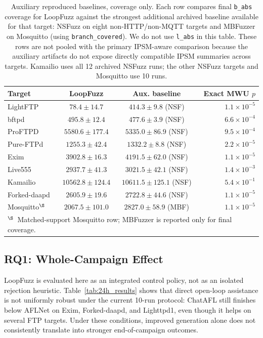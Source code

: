 \documentclass[conference]{IEEEtran}
\begin{document}
\begin{table}[!t]
\centering
\caption{Auxiliary reproduced baselines, coverage only. Each row compares final \texttt{b\_abs} coverage for LoopFuzz against the strongest additional archived baseline available for that target: NSFuzz on eight non-HTTP/non-MQTT targets and MBFuzzer on Mosquitto (using \texttt{branch\_covered}). We do not use \texttt{l\_abs} in this table. These rows are not pooled with the primary IPSM-aware comparison because the auxiliary artifacts do not expose directly compatible IPSM summaries across targets. Kamailio uses all 12 archived NSFuzz runs; the other NSFuzz targets and Mosquitto use 10 runs.}
\label{tab:aux_results}
{\scriptsize
\setlength{\tabcolsep}{3.2pt}
\renewcommand{\arraystretch}{0.96}
\begin{tabular}{l|ccr}
\toprule
Target & LoopFuzz & Aux. baseline & Exact MWU $p$ \\
\midrule
LightFTP & $78.4 {\pm} 14.7$ & $\mathbf{414.3 {\pm} 9.8}$ (NSF) & $1.1{\times}10^{-5}$ \\
bftpd & $\mathbf{495.8 {\pm} 12.4}$ & $477.6 {\pm} 3.9$ (NSF) & $6.6{\times}10^{-4}$ \\
ProFTPD & $\mathbf{5580.6 {\pm} 177.4}$ & $5335.0 {\pm} 86.9$ (NSF) & $9.5{\times}10^{-4}$ \\
Pure-FTPd & $1255.3 {\pm} 42.4$ & $\mathbf{1332.2 {\pm} 8.8}$ (NSF) & $2.2{\times}10^{-5}$ \\
Exim & $3902.8 {\pm} 16.3$ & $\mathbf{4191.5 {\pm} 62.0}$ (NSF) & $1.1{\times}10^{-5}$ \\
Live555 & $2937.7 {\pm} 41.3$ & $\mathbf{3021.5 {\pm} 42.1}$ (NSF) & $1.4{\times}10^{-3}$ \\
Kamailio & $10562.8 {\pm} 124.4$ & $\mathbf{10611.5 {\pm} 125.1}$ (NSF) & $5.4{\times}10^{-1}$ \\
Forked-daapd & $2605.9 {\pm} 19.6$ & $\mathbf{2722.8 {\pm} 44.6}$ (NSF) & $1.1{\times}10^{-5}$ \\
Mosquitto$^{\S}$ & $2067.5 {\pm} 101.0$ & $\mathbf{2827.0 {\pm} 58.9}$ (MBF) & $1.1{\times}10^{-5}$ \\
\bottomrule
\multicolumn{4}{l}{\footnotesize $^{\S}$~Matched-support Mosquitto row; MBFuzzer is reported only for final coverage.} \\
\end{tabular}
}
\end{table}

\subsection{RQ1: Whole-Campaign Effect}
LoopFuzz is evaluated here as an integrated control policy, not as an isolated rejection heuristic. Table~\ref{tab:24h_results} shows that direct open-loop assistance is not uniformly robust under the current 10-run protocol: ChatAFL still finishes below AFLNet on Exim, Forked-daapd, and Lighttpd1, even though it helps on several FTP targets. Under these conditions, improved generation alone does not consistently translate into stronger end-of-campaign outcomes.
\end{document}
